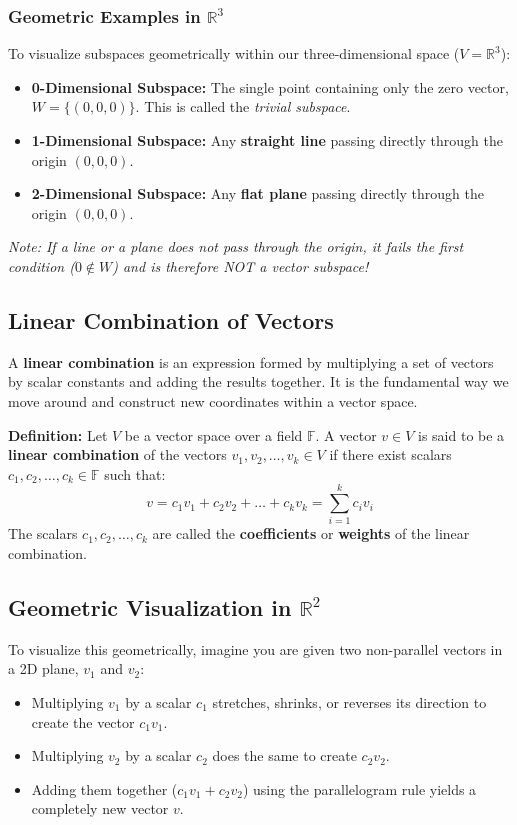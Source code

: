 \documentclass[11pt, a4paper]{article}
\begin{document}
	\subsubsection*{Geometric Examples in $\mathbb{R}^3$}
	To visualize subspaces geometrically within our three-dimensional space ($V = \mathbb{R}^3$):
	\begin{itemize}
		\item \textbf{0-Dimensional Subspace:} The single point containing only the zero vector, $W = \{(0,0,0)\}$. This is called the \textit{trivial subspace}.
		\item \textbf{1-Dimensional Subspace:} Any \textbf{straight line} passing directly through the origin $(0,0,0)$. 
		\item \textbf{2-Dimensional Subspace:} Any \textbf{flat plane} passing directly through the origin $(0,0,0)$.
	\end{itemize}
	\textit{Note: If a line or a plane does not pass through the origin, it fails the first condition ($0 \notin W$) and is therefore NOT a vector subspace!}
	
	\subsection{Linear Combination of Vectors}
	A \textbf{linear combination} is an expression formed by multiplying a set of vectors by scalar constants and adding the results together. It is the fundamental way we move around and construct new coordinates within a vector space.
	
	\noindent \textbf{Definition:} Let $V$ be a vector space over a field $\mathbb{F}$. A vector $v \in V$ is said to be a \textbf{linear combination} of the vectors $v_1, v_2, \dots, v_k \in V$ if there exist scalars $c_1, c_2, \dots, c_k \in \mathbb{F}$ such that:
	\[
	v = c_1 v_1 + c_2 v_2 + \dots + c_k v_k = \sum_{i=1}^{k} c_i v_i
	\]
	The scalars $c_1, c_2, \dots, c_k$ are called the \textbf{coefficients} or \textbf{weights} of the linear combination.
	
	\subsection*{Geometric Visualization in $\mathbb{R}^2$}
	To visualize this geometrically, imagine you are given two non-parallel vectors in a 2D plane, $v_1$ and $v_2$:
	\begin{itemize}
		\item Multiplying $v_1$ by a scalar $c_1$ stretches, shrinks, or reverses its direction to create the vector $c_1 v_1$.
		\item Multiplying $v_2$ by a scalar $c_2$ does the same to create $c_2 v_2$.
		\item Adding them together ($c_1 v_1 + c_2 v_2$) using the parallelogram rule yields a completely new vector $v$.
	\end{itemize}
	
\end{document}

